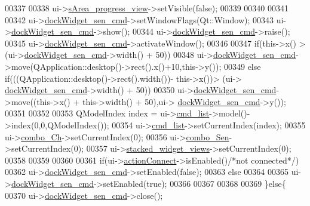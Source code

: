 \begin{DoxyCode}
00337 
00338         ui->\hyperlink{a00027_ae4fe44aa026dd0e84e0f10cdcabca504}{sArea\_progress\_view}->setVisible(\textcolor{keyword}{false});
00339 
00340 
00341 
00342         ui->\hyperlink{a00027_a9eb86a5ee396766f0f4a65f2d2bd7688}{dockWidget\_sen\_cmd}->setWindowFlags(Qt::Window);
00343         ui->\hyperlink{a00027_a9eb86a5ee396766f0f4a65f2d2bd7688}{dockWidget\_sen\_cmd}->show();
00344         ui->\hyperlink{a00027_a9eb86a5ee396766f0f4a65f2d2bd7688}{dockWidget\_sen\_cmd}->raise();
00345         ui->\hyperlink{a00027_a9eb86a5ee396766f0f4a65f2d2bd7688}{dockWidget\_sen\_cmd}->activateWindow();
00346 
00347         \textcolor{keywordflow}{if}(this->x() > (ui->\hyperlink{a00027_a9eb86a5ee396766f0f4a65f2d2bd7688}{dockWidget\_sen\_cmd}->width() + 50))
00348         ui->\hyperlink{a00027_a9eb86a5ee396766f0f4a65f2d2bd7688}{dockWidget\_sen\_cmd}->move(QApplication::desktop()->rect().x()+10,this->y());
00349         \textcolor{keywordflow}{else} \textcolor{keywordflow}{if}(((QApplication::desktop()->rect().width())- this->x())> (ui->
      \hyperlink{a00027_a9eb86a5ee396766f0f4a65f2d2bd7688}{dockWidget\_sen\_cmd}->width() + 50))
00350         ui->\hyperlink{a00027_a9eb86a5ee396766f0f4a65f2d2bd7688}{dockWidget\_sen\_cmd}->move((this->x() + this->width() + 50),ui->
      \hyperlink{a00027_a9eb86a5ee396766f0f4a65f2d2bd7688}{dockWidget\_sen\_cmd}->y());
00351 
00352 
00353         QModelIndex index = ui->\hyperlink{a00027_aa66ece71395b435e915d384fb63bac1d}{cmd\_list}->model()->index(0,0,QModelIndex());
00354         ui->\hyperlink{a00027_aa66ece71395b435e915d384fb63bac1d}{cmd\_list}->setCurrentIndex(index);
00355         ui->\hyperlink{a00027_a263fb43f2eff37a44ff7359ba41e2eeb}{combo\_Ch}->setCurrentIndex(0);
00356         ui->\hyperlink{a00027_ad95005b5fcac8126171019298147b285}{combo\_Sen}->setCurrentIndex(0);
00357         ui->\hyperlink{a00027_a59e39bd3d716004e840a5be5dda18b96}{stacked\_widget\_views}->setCurrentIndex(0);
00358 
00359 
00360 
00361         \textcolor{keywordflow}{if}(ui->\hyperlink{a00027_aa0785566311fc48271690fb68b1d4c5f}{actionConnect}->isEnabled()\textcolor{comment}{/*not connected*/})
00362           ui->\hyperlink{a00027_a9eb86a5ee396766f0f4a65f2d2bd7688}{dockWidget\_sen\_cmd}->setEnabled(\textcolor{keyword}{false});
00363         \textcolor{keywordflow}{else}
00364 
00365             ui->\hyperlink{a00027_a9eb86a5ee396766f0f4a65f2d2bd7688}{dockWidget\_sen\_cmd}->setEnabled(\textcolor{keyword}{true});
00366 
00367 
00368 
00369     \}\textcolor{keywordflow}{else}\{
00370         ui->\hyperlink{a00027_a9eb86a5ee396766f0f4a65f2d2bd7688}{dockWidget\_sen\_cmd}->close();

\end{DoxyCode}
